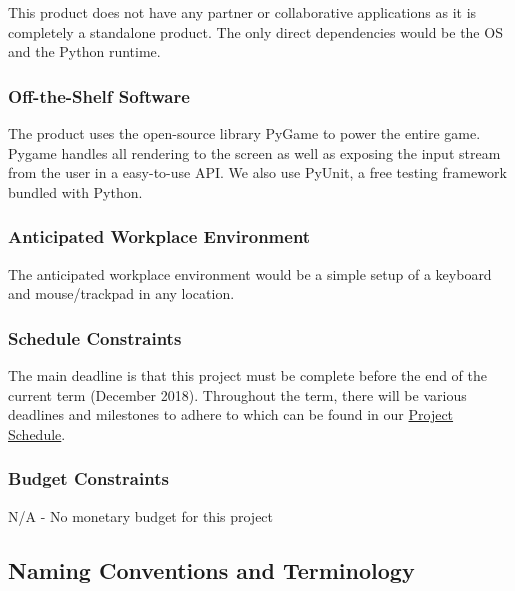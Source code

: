 \documentclass[12pt, titlepage]{article}
\begin{document}
This product does not have any partner or collaborative applications as it is completely a standalone product. The only direct dependencies would be the OS and the Python runtime.

\subsubsection{Off-the-Shelf Software}

The product uses the open-source library PyGame to power the entire game. Pygame handles all rendering to the screen as well as exposing the input stream from the user in a easy-to-use API. We also use PyUnit, a free testing framework bundled with Python.

\subsubsection{Anticipated Workplace Environment}

The anticipated workplace environment would be a simple setup of a keyboard and mouse/trackpad in any location.

\subsubsection{Schedule Constraints}
The main deadline is that this project must be complete before the end of the current term (December 2018). Throughout the term, there will be various deadlines and milestones to adhere to which can be found in our
\href{https://gitlab.cas.mcmaster.ca/kalerg1/se3xa3/tree/master/Sokoban-Game/ProjectSchedule}{Project Schedule}.

\subsubsection{Budget Constraints}

N/A - No monetary budget for this project

\subsection{Naming Conventions and Terminology}
\end{document}
